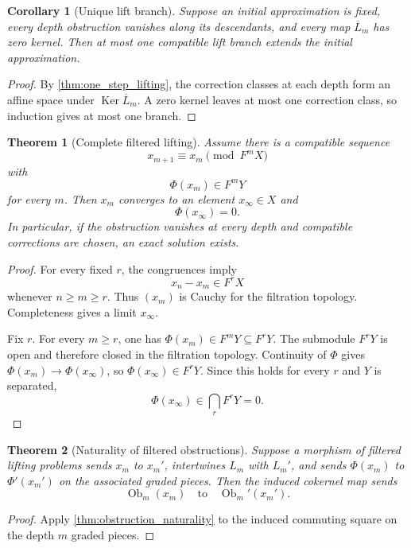 \documentclass{aomart}
\newtheorem{theorem}{Theorem}[section]
\newtheorem{corollary}[corollary]{Corollary}
\theoremstyle{definition}
\theoremstyle{remark}
\newcommand{\Ker}{\operatorname{Ker}}
\newcommand{\Ob}{\operatorname{Ob}}
\begin{document}
\begin{corollary}[Unique lift branch]\label{cor:unique_lift_branch}
Suppose an initial approximation is fixed, every depth obstruction vanishes along its descendants, and every map $\overline L_m$ has zero kernel.  Then at most one compatible lift branch extends the initial approximation.
\end{corollary}

\begin{proof}
By \cref{thm:one_step_lifting}, the correction classes at each depth form an affine space under $\Ker\overline L_m$.  A zero kernel leaves at most one correction class, so induction gives at most one branch.
\end{proof}

\begin{theorem}[Complete filtered lifting]\label{thm:complete_filtered_lifting}
Assume there is a compatible sequence
\[
x_{m+1}\equiv x_m\pmod{F^mX}
\]
with
\[
\Phi(x_m)\in F^mY
\]
for every $m$.  Then $x_m$ converges to an element $x_\infty\in X$ and
\[
\Phi(x_\infty)=0.
\]
In particular, if the obstruction vanishes at every depth and compatible corrections are chosen, an exact solution exists.
\end{theorem}

\begin{proof}
For every fixed $r$, the congruences imply
\[
x_n-x_m\in F^rX
\]
whenever $n\ge m\ge r$.  Thus $(x_m)$ is Cauchy for the filtration topology.  Completeness gives a limit $x_\infty$.

Fix $r$.  For every $m\ge r$, one has $\Phi(x_m)\in F^mY\subseteq F^rY$.  The submodule $F^rY$ is open and therefore closed in the filtration topology.  Continuity of $\Phi$ gives $\Phi(x_m)\to\Phi(x_\infty)$, so $\Phi(x_\infty)\in F^rY$.  Since this holds for every $r$ and $Y$ is separated,
\[
\Phi(x_\infty)\in\bigcap_rF^rY=0.
\]
\end{proof}

\begin{theorem}[Naturality of filtered obstructions]\label{thm:filtered_obstruction_naturality}
Suppose a morphism of filtered lifting problems sends $x_m$ to $x_m'$, intertwines $L_m$ with $L_m'$, and sends $\Phi(x_m)$ to $\Phi'(x_m')$ on the associated graded pieces.  Then the induced cokernel map sends
\[
\Ob_m(x_m)
\quad\text{to}\quad
\Ob_m'(x_m').
\]
\end{theorem}

\begin{proof}
Apply \cref{thm:obstruction_naturality} to the induced commuting square on the depth $m$ graded pieces.
\end{proof}
\end{document}
